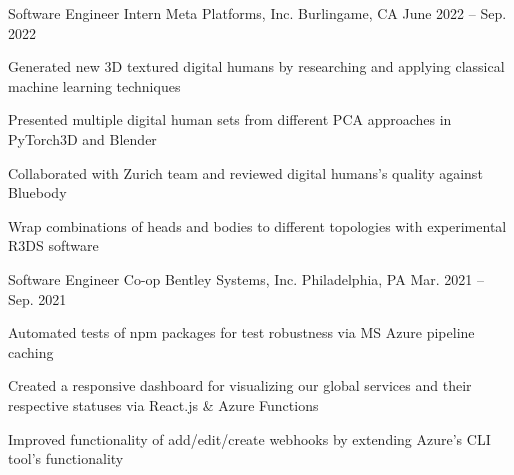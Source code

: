 

\begin{cventries}
  \cventry
  {Software Engineer Intern} %
  {Meta Platforms, Inc.} %
  {Burlingame, CA} %
  {June 2022 -- Sep. 2022} %
  {
    \begin{cvitems} %
      \item {Generated new 3D textured digital humans by researching and applying classical machine learning techniques}
      \item {Presented multiple digital human sets from different PCA approaches in PyTorch3D and Blender}
      \item {Collaborated with Zurich team and reviewed digital humans's quality against Bluebody}
      \item {Wrap combinations of heads and bodies to different topologies with experimental R3DS software}
    \end{cvitems}
  }

  \cventry
  {Software Engineer Co-op} %
  {Bentley Systems, Inc.} %
  {Philadelphia, PA} %
  {Mar. 2021 -- Sep. 2021} %
  {
    \begin{cvitems} %
      \item {Automated tests of npm packages for test robustness via MS Azure pipeline caching}
      \item {Created a responsive dashboard for visualizing our global services and their respective statuses via React.js \& Azure Functions}
      \item {Improved functionality of add/edit/create webhooks by extending Azure's CLI tool's functionality}
    \end{cvitems}
  }


\end{cventries}
